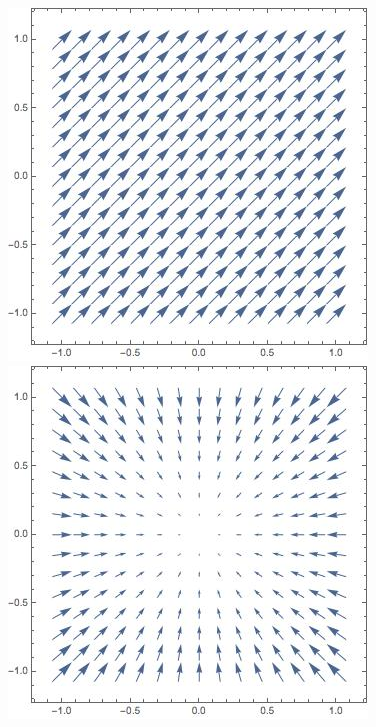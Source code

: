 \documentclass[12pt]{article}
\begin{document}
\begin{figure}[h]
  \includegraphics[width=\linewidth]{zerdiv.jpeg}
  \caption{}\label{fig4}
\endminipage\hfill
{}%
  \includegraphics[width=\linewidth]{negdiv.jpeg}
  \caption{}\label{fig5}
\endminipage
\end{figure}
\end{document}
